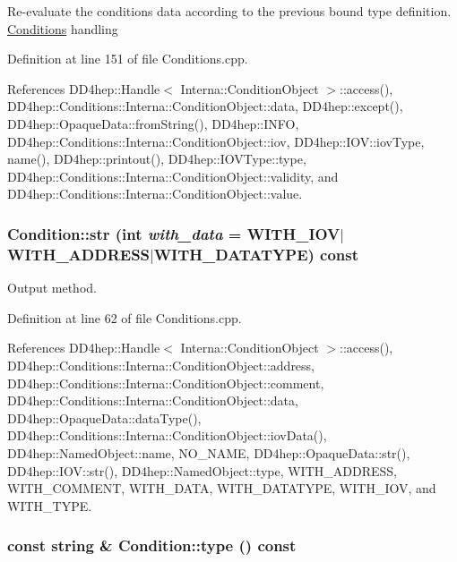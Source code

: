 Re-\/evaluate the conditions data according to the previous bound type definition. \hyperlink{namespace_d_d4hep_1_1_conditions}{Conditions} handling 

Definition at line 151 of file Conditions.cpp.

References DD4hep::Handle$<$ Interna::ConditionObject $>$::access(), DD4hep::Conditions::Interna::ConditionObject::data, DD4hep::except(), DD4hep::OpaqueData::fromString(), DD4hep::INFO, DD4hep::Conditions::Interna::ConditionObject::iov, DD4hep::IOV::iovType, name(), DD4hep::printout(), DD4hep::IOVType::type, DD4hep::Conditions::Interna::ConditionObject::validity, and DD4hep::Conditions::Interna::ConditionObject::value.\hypertarget{class_d_d4hep_1_1_conditions_1_1_condition_ac877415327919f75d4d88d3f9c67f2f5}{
\subsubsection[{str}]{ Condition::str (int {\em with\_\-data} = {\ttfamily WITH\_\-IOV$|$WITH\_\-ADDRESS$|$WITH\_\-DATATYPE}) const}}
\label{class_d_d4hep_1_1_conditions_1_1_condition_ac877415327919f75d4d88d3f9c67f2f5}


Output method. 

Definition at line 62 of file Conditions.cpp.

References DD4hep::Handle$<$ Interna::ConditionObject $>$::access(), DD4hep::Conditions::Interna::ConditionObject::address, DD4hep::Conditions::Interna::ConditionObject::comment, DD4hep::Conditions::Interna::ConditionObject::data, DD4hep::OpaqueData::dataType(), DD4hep::Conditions::Interna::ConditionObject::iovData(), DD4hep::NamedObject::name, NO\_\-NAME, DD4hep::OpaqueData::str(), DD4hep::IOV::str(), DD4hep::NamedObject::type, WITH\_\-ADDRESS, WITH\_\-COMMENT, WITH\_\-DATA, WITH\_\-DATATYPE, WITH\_\-IOV, and WITH\_\-TYPE.\hypertarget{class_d_d4hep_1_1_conditions_1_1_condition_ad9e7b6937816fe75a440802f835de6bc}{
\subsubsection[{type}]{\setlength{\rightskip}{0pt plus 5cm}const {\bf string} \& Condition::type () const}}
\label{class_d_d4hep_1_1_conditions_1_1_condition_ad9e7b6937816fe75a440802f835de6bc}


